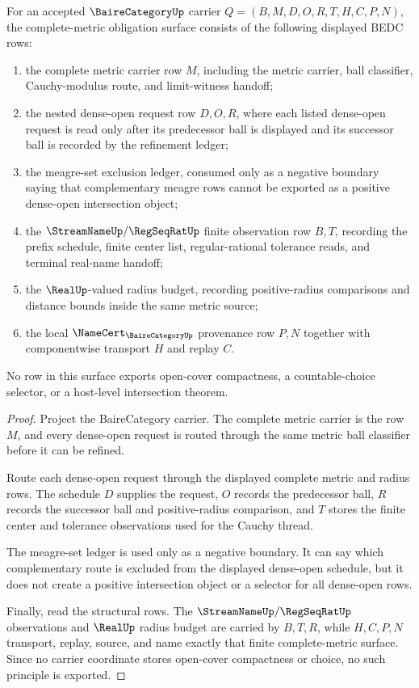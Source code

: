 \begin{theorem}
\label{thm:bairecategory-complete-metric-obligation-surface}
For an accepted $\BaireCategoryUp$ carrier $Q=(B,M,D,O,R,T,H,C,P,N)$, the complete-metric obligation surface consists of the following displayed BEDC rows:
\begin{enumerate}
\item the complete metric carrier row $M$, including the metric carrier, ball classifier, Cauchy-modulus route, and limit-witness handoff;
\item the nested dense-open request row $D,O,R$, where each listed dense-open request is read only after its predecessor ball is displayed and its successor ball is recorded by the refinement ledger;
\item the meagre-set exclusion ledger, consumed only as a negative boundary saying that complementary meagre rows cannot be exported as a positive dense-open intersection object;
\item the $\StreamNameUp/\RegSeqRatUp$ finite observation row $B,T$, recording the prefix schedule, finite center list, regular-rational tolerance reads, and terminal real-name handoff;
\item the $\RealUp$-valued radius budget, recording positive-radius comparisons and distance bounds inside the same metric source;
\item the local $\NameCert_{\BaireCategoryUp}$ provenance row $P,N$ together with componentwise transport $H$ and replay $C$.
\end{enumerate}
No row in this surface exports open-cover compactness, a countable-choice selector, or a host-level intersection theorem.
\end{theorem}
\begin{proof}
Project the BaireCategory carrier. The complete metric carrier is the row $M$, and every dense-open request is routed through the same metric ball classifier before it can be refined.

Route each dense-open request through the displayed complete metric and radius rows. The schedule $D$ supplies the request, $O$ records the predecessor ball, $R$ records the successor ball and positive-radius comparison, and $T$ stores the finite center and tolerance observations used for the Cauchy thread.

The meagre-set ledger is used only as a negative boundary. It can say which complementary route is excluded from the displayed dense-open schedule, but it does not create a positive intersection object or a selector for all dense-open rows.

Finally, read the structural rows. The $\StreamNameUp/\RegSeqRatUp$ observations and $\RealUp$ radius budget are carried by $B,T,R$, while $H,C,P,N$ transport, replay, source, and name exactly that finite complete-metric surface. Since no carrier coordinate stores open-cover compactness or choice, no such principle is exported.
\end{proof}

